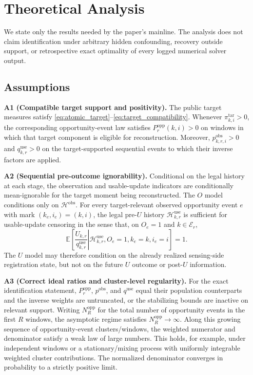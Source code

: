 \documentclass[letterpaper,journal]{IEEEtran}
\begin{document}
\section{Theoretical Analysis}
\label{sec:theory}

We state only the results needed by the paper's mainline.  The analysis does not
claim identification under arbitrary hidden confounding, recovery outside
support, or retrospective exact optimality of every logged numerical solver
output.

\subsection{Assumptions}
\label{subsec:assumptions}

\noindent\textbf{A1 (Compatible target support and positivity).}
The public target measures satisfy
\eqref{eq:atomic_target}--\eqref{eq:target_compatibility}.  Whenever
$\pi^{\mathrm{tar}}_{k,i}>0$, the corresponding opportunity-event law satisfies
$P_r^{\mathrm{opp}}(k,i)>0$ on windows in which that target component is
eligible for reconstruction.  Moreover,
$p^{\mathrm{obs}}_{k,r,i}>0$ and $q^{\mathrm{use}}_{k,r}>0$ on the
target-supported sequential events to which their inverse factors are applied.

\noindent\textbf{A2 (Sequential pre-outcome ignorability).}
Conditional on the legal history at each stage, the observation and
usable-update indicators are conditionally mean-ignorable for the target moment
being reconstructed.  The $O$ model conditions only on
$\mathcal{H}^{\mathrm{obs}}$.  For every target-relevant observed opportunity
event $e$ with mark $(k_e,i_e)=(k,i)$, the legal pre-$U$ history
$\mathcal{H}^{\mathrm{use}}_{k,r}$ is sufficient for usable-update censoring in
the sense that, on $O_e=1$ and $k\in\mathcal{E}_r$,
\begin{equation}
 \mathbb{E}\!\left[
 \left.
 \frac{U_{k,r}}{q^{\mathrm{use}}_{k,r}}
 \right|
 \mathcal{H}^{\mathrm{use}}_{k,r},
 O_e=1,k_e=k,i_e=i
 \right]
 =1.
 \label{eq:A2_use_mean_ignorability}
\end{equation}
The $U$ model may therefore condition on the already realized sensing-side
registration state, but not on the future $U$ outcome or post-$U$ information.

\noindent\textbf{A3 (Correct ideal ratios and cluster-level regularity).}
For the exact identification statement,
$P_r^{\mathrm{opp}}$, $p^{\mathrm{obs}}$, and $q^{\mathrm{use}}$ equal their
population counterparts and the inverse weights are untruncated, or the
stabilizing bounds are inactive on relevant support.  Writing
$N_R^{\mathrm{opp}}$ for the total number of opportunity events in the first
$R$ windows, the asymptotic regime satisfies
$N_R^{\mathrm{opp}}\rightarrow\infty$.  Along this growing sequence of
opportunity-event clusters/windows, the weighted numerator and denominator
satisfy a weak law of large numbers.  This holds, for example, under
independent windows or a stationary/mixing process with uniformly integrable
weighted cluster contributions.  The normalized denominator converges in
probability to a strictly positive limit.
\end{document}
